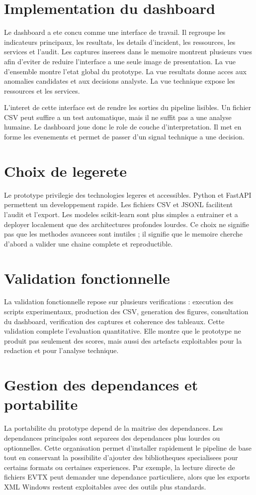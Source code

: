 \section{Implementation du dashboard}
Le dashboard a ete concu comme une interface de travail. Il regroupe les indicateurs principaux, les resultats, les details d'incident, les ressources, les services et l'audit. Les captures inserees dans le memoire montrent plusieurs vues afin d'eviter de reduire l'interface a une seule image de presentation. La vue d'ensemble montre l'etat global du prototype. La vue resultats donne acces aux anomalies candidates et aux decisions analyste. La vue technique expose les ressources et les services.

L'interet de cette interface est de rendre les sorties du pipeline lisibles. Un fichier CSV peut suffire a un test automatique, mais il ne suffit pas a une analyse humaine. Le dashboard joue donc le role de couche d'interpretation. Il met en forme les evenements et permet de passer d'un signal technique a une decision.

\section{Choix de legerete}
Le prototype privilegie des technologies legeres et accessibles. Python et FastAPI permettent un developpement rapide. Les fichiers CSV et JSONL facilitent l'audit et l'export. Les modeles scikit-learn sont plus simples a entrainer et a deployer localement que des architectures profondes lourdes. Ce choix ne signifie pas que les methodes avancees sont inutiles ; il signifie que le memoire cherche d'abord a valider une chaine complete et reproductible.

\section{Validation fonctionnelle}
La validation fonctionnelle repose sur plusieurs verifications : execution des scripts experimentaux, production des CSV, generation des figures, consultation du dashboard, verification des captures et coherence des tableaux. Cette validation complete l'evaluation quantitative. Elle montre que le prototype ne produit pas seulement des scores, mais aussi des artefacts exploitables pour la redaction et pour l'analyse technique.

\section{Gestion des dependances et portabilite}
La portabilite du prototype depend de la maitrise des dependances. Les dependances principales sont separees des dependances plus lourdes ou optionnelles. Cette organisation permet d'installer rapidement le pipeline de base tout en conservant la possibilite d'ajouter des bibliotheques specialisees pour certains formats ou certaines experiences. Par exemple, la lecture directe de fichiers EVTX peut demander une dependance particuliere, alors que les exports XML Windows restent exploitables avec des outils plus standards.

